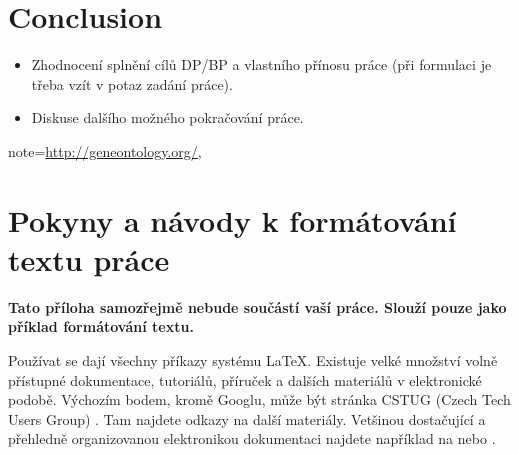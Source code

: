 \documentclass[11pt,twoside,a4paper]{book}
\begin{document}
\chapter{Conclusion}

\begin{itemize}
\item Zhodnocení splnění cílů DP/BP a  vlastního přínosu práce (při formulaci je třeba vzít v potaz zadání práce).
\item Diskuse dalšího možného pokračování práce.\end{itemize}   note={\url{http://geneontology.org/}},



%

%
%
{
\def\CS{$\cal C\kern-0.1667em\lower.5ex\hbox{$\cal S$}\kern-0.075em $}

}

%

\chapter{Pokyny a návody k formátování textu práce}
\textbf{\large Tato příloha samozřejmě nebude součástí vaší práce. Slouží pouze jako příklad formátování textu.}

Používat se dají všechny příkazy systému \LaTeX. Existuje velké množství volně přístupné dokumentace, tutoriálů, příruček a dalších materiálů v elektronické podobě. Výchozím bodem, kromě Googlu, může být stránka CSTUG (Czech Tech Users Group) \cite{CSTUG}. Tam najdete odkazy na další materiály.  Vetšinou dostačující a přehledně organizovanou elektronikou dokumentaci najdete například na \cite{latexdocweb} nebo \cite{latexwiki}.
\end{document}
